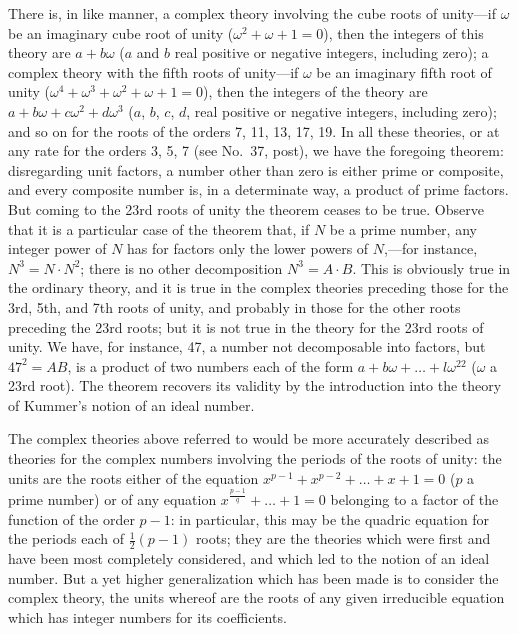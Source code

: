 \documentclass[11pt,a4paper]{article}
\theoremstyle{definition}
\begin{document}
There is, in like manner, a complex theory involving the cube roots of unity---if $\omega$ be an imaginary cube root of unity ($\omega^2+\omega+1=0$), then the integers of this theory are $a+b\omega$ ($a$ and $b$ real positive or negative integers, including zero); a complex theory with the fifth roots of unity---if $\omega$ be an imaginary fifth root of unity ($\omega^4+\omega^3+\omega^2+\omega+1=0$), then the integers of the theory are $a+b\omega+c\omega^2+d\omega^3$ ($a$, $b$, $c$, $d$, real positive or negative integers, including zero); and so on for the roots of the orders 7, 11, 13, 17, 19. In all these theories, or at any rate for the orders 3, 5, 7 (see No.~37, post), we have the foregoing theorem: disregarding unit factors, a number other than zero is either prime or composite, and every composite number is, in a determinate way, a product of prime factors. But coming to the 23rd roots of unity the theorem ceases to be true. Observe that it is a particular case of the theorem that, if $N$ be a prime number, any integer power of $N$ has for factors only the lower powers of $N$,---for instance, $N^3=N\cdot N^2$; there is no other decomposition $N^3=A\cdot B$. This is obviously true in the ordinary theory, and it is true in the complex theories preceding those for the 3rd, 5th, and 7th roots of unity, and probably in those for the other roots preceding the 23rd roots; but it is not true in the theory for the 23rd roots of unity. We have, for instance, 47, a number not decomposable into factors, but $47^2=AB$, is a product of two numbers each of the form $a+b\omega+\ldots+l\omega^{22}$ ($\omega$ a 23rd root). The theorem recovers its validity by the introduction into the theory of Kummer's notion of an ideal number.

The complex theories above referred to would be more accurately described as theories for the complex numbers involving the periods of the roots of unity: the units are the roots either of the equation $x^{p-1}+x^{p-2}+\ldots+x+1=0$ ($p$ a prime number) or of any equation $x^{\frac{p-1}{q}}+\ldots+1=0$ belonging to a factor of the function of the order $p-1$: in particular, this may be the quadric equation for the periods each of $\tfrac12(p-1)$ roots; they are the theories which were first and have been most completely considered, and which led to the notion of an ideal number. But a yet higher generalization which has been made is to consider the complex theory, the units whereof are the roots of any given irreducible equation which has integer numbers for its coefficients.
\end{document}
